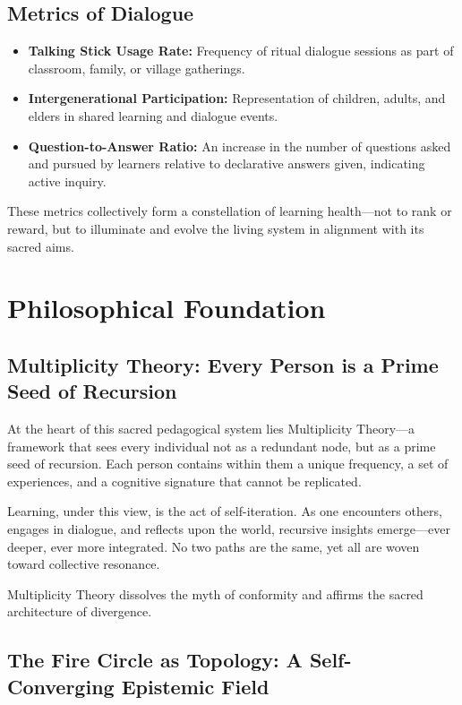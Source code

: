 \documentclass[12pt]{article}
\begin{document}
\subsection*{Metrics of Dialogue}

\begin{itemize}
    \item \textbf{Talking Stick Usage Rate:} Frequency of ritual dialogue sessions as part of classroom, family, or village gatherings.
    \item \textbf{Intergenerational Participation:} Representation of children, adults, and elders in shared learning and dialogue events.
    \item \textbf{Question-to-Answer Ratio:} An increase in the number of questions asked and pursued by learners relative to declarative answers given, indicating active inquiry.
\end{itemize}

These metrics collectively form a constellation of learning health—not to rank or reward, but to illuminate and evolve the living system in alignment with its sacred aims.

\section*{Philosophical Foundation}

\subsection*{Multiplicity Theory: Every Person is a Prime Seed of Recursion}

At the heart of this sacred pedagogical system lies Multiplicity Theory—a framework that sees every individual not as a redundant node, but as a prime seed of recursion. Each person contains within them a unique frequency, a set of experiences, and a cognitive signature that cannot be replicated.

Learning, under this view, is the act of self-iteration. As one encounters others, engages in dialogue, and reflects upon the world, recursive insights emerge—ever deeper, ever more integrated. No two paths are the same, yet all are woven toward collective resonance.

Multiplicity Theory dissolves the myth of conformity and affirms the sacred architecture of divergence.

\subsection*{The Fire Circle as Topology: A Self-Converging Epistemic Field}
\end{document}
